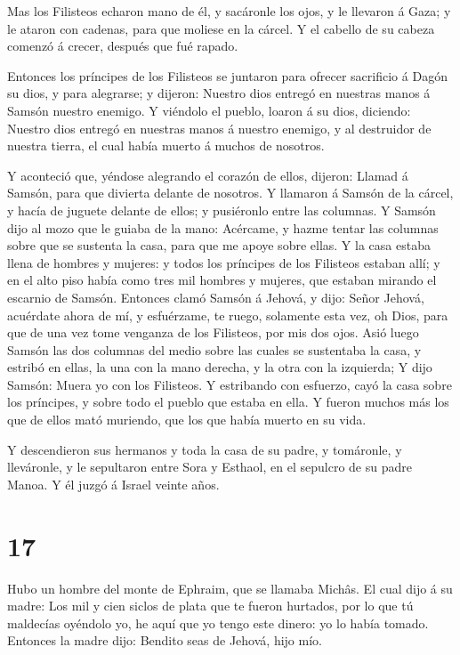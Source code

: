 Mas los Filisteos echaron mano de él, y sacáronle los
ojos, y le llevaron á Gaza; y le ataron con cadenas, para que moliese en
la cárcel.  Y el cabello de su cabeza comenzó á crecer,
después que fué rapado.

 Entonces los príncipes de los Filisteos se juntaron para
ofrecer sacrificio á Dagón su dios, y para alegrarse; y dijeron: Nuestro
dios entregó en nuestras manos á Samsón nuestro enemigo.  Y
viéndolo el pueblo, loaron á su dios, diciendo: Nuestro dios entregó en
nuestras manos á nuestro enemigo, y al destruidor de nuestra tierra, el
cual había muerto á muchos de nosotros.

 Y aconteció que, yéndose alegrando el corazón de ellos,
dijeron: Llamad á Samsón, para que divierta delante de nosotros. Y
llamaron á Samsón de la cárcel, y hacía de juguete delante de ellos; y
pusiéronlo entre las columnas.  Y Samsón dijo al mozo que
le guiaba de la mano: Acércame, y hazme tentar las columnas sobre que se
sustenta la casa, para que me apoye sobre ellas.  Y la casa
estaba llena de hombres y mujeres: y todos los príncipes de los
Filisteos estaban allí; y en el alto piso había como tres mil hombres y
mujeres, que estaban mirando el escarnio de Samsón. 
Entonces clamó Samsón á Jehová, y dijo: Señor Jehová, acuérdate ahora de
mí, y esfuérzame, te ruego, solamente esta vez, oh Dios, para que de una
vez tome venganza de los Filisteos, por mis dos ojos.  Asió
luego Samsón las dos columnas del medio sobre las cuales se sustentaba
la casa, y estribó en ellas, la una con la mano derecha, y la otra con
la izquierda;  Y dijo Samsón: Muera yo con los Filisteos. Y
estribando con esfuerzo, cayó la casa sobre los príncipes, y sobre todo
el pueblo que estaba en ella. Y fueron muchos más los que de ellos mató
muriendo, que los que había muerto en su vida.

 Y descendieron sus hermanos y toda la casa de su padre, y
tomáronle, y lleváronle, y le sepultaron entre Sora y Esthaol, en el
sepulcro de su padre Manoa. Y él juzgó á Israel veinte años.

\hypertarget{section-16}{%
\section{17}\label{section-16}}

 Hubo un hombre del monte de Ephraim, que se llamaba Michâs.
 El cual dijo á su madre: Los mil y cien siclos de plata que
te fueron hurtados, por lo que tú maldecías oyéndolo yo, he aquí que yo
tengo este dinero: yo lo había tomado. Entonces la madre dijo: Bendito
seas de Jehová, hijo mío.

